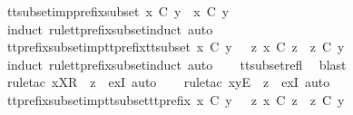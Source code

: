 \begin{isabellebody}
\endisatagproof
{\isafoldproof}%
%
\isadelimproof
\isanewline
%
\endisadelimproof
\isanewline
{}\isamarkupfalse%
\ tt{\isacharunderscore}subset{\isacharunderscore}imp{\isacharunderscore}prefix{\isacharunderscore}subset{\isacharcolon}\ {\isachardoublequoteopen}x\ {\isasymsubseteq}\isactrlsub C\ y\ {\isasymLongrightarrow}\ x\ {\isasymlesssim}\isactrlsub C\ y{\isachardoublequoteclose}\isanewline
%
\isadelimproof
\ \ %
\endisadelimproof
%
\isatagproof
{}\isamarkupfalse%
\ {\isacharparenleft}induct\ rule{\isacharcolon}tt{\isacharunderscore}prefix{\isacharunderscore}subset{\isachardot}induct{\isacharcomma}\ auto{\isacharparenright}%
\endisatagproof
{\isafoldproof}%
%
\isadelimproof
\isanewline
%
\endisadelimproof
\isanewline
{}\isamarkupfalse%
\ tt{\isacharunderscore}prefix{\isacharunderscore}subset{\isacharunderscore}imp{\isacharunderscore}tt{\isacharunderscore}prefix{\isacharunderscore}tt{\isacharunderscore}subset{\isacharcolon}\ {\isachardoublequoteopen}x\ {\isasymlesssim}\isactrlsub C\ y\ {\isasymLongrightarrow}\ {\isasymexists}\ z{\isachardot}\ x\ {\isasymle}\isactrlsub C\ z\ {\isasymand}\ z\ {\isasymsubseteq}\isactrlsub C\ y{\isachardoublequoteclose}\isanewline
%
\isadelimproof
\ \ %
\endisadelimproof
%
\isatagproof
{}\isamarkupfalse%
\ {\isacharparenleft}induct\ rule{\isacharcolon}tt{\isacharunderscore}prefix{\isacharunderscore}subset{\isachardot}induct{\isacharcomma}\ auto{\isacharparenright}\isanewline
\ \ \isamarkupfalse%
\ tt{\isacharunderscore}subset{\isacharunderscore}refl\ \isamarkupfalse%
\ blast\isanewline
\ \ \isamarkupfalse%
\ {\isacharparenleft}rule{\isacharunderscore}tac\ x{\isacharequal}{\isachardoublequoteopen}{\isacharbrackleft}X{\isacharbrackright}\isactrlsub R\ {\isacharhash}\ z{\isachardoublequoteclose}\ \ exI{\isacharcomma}\ auto{\isacharparenright}\isanewline
\ \ \isamarkupfalse%
\ {\isacharparenleft}rule{\isacharunderscore}tac\ x{\isacharequal}{\isachardoublequoteopen}{\isacharbrackleft}y{\isacharbrackright}\isactrlsub E\ {\isacharhash}\ z{\isachardoublequoteclose}\ \ exI{\isacharcomma}\ auto{\isacharparenright}\isanewline
\ \ \isamarkupfalse%
%
\endisatagproof
{\isafoldproof}%
%
\isadelimproof
\isanewline
%
\endisadelimproof
\isanewline
{}\isamarkupfalse%
\ tt{\isacharunderscore}prefix{\isacharunderscore}subset{\isacharunderscore}imp{\isacharunderscore}tt{\isacharunderscore}subset{\isacharunderscore}tt{\isacharunderscore}prefix{\isacharcolon}\ {\isachardoublequoteopen}x\ {\isasymlesssim}\isactrlsub C\ y\ {\isasymLongrightarrow}\ {\isasymexists}\ z{\isachardot}\ x\ {\isasymsubseteq}\isactrlsub C\ z\ {\isasymand}\ z\ {\isasymle}\isactrlsub C\ y{\isachardoublequoteclose}\isanewline

\end{isabellebody}
